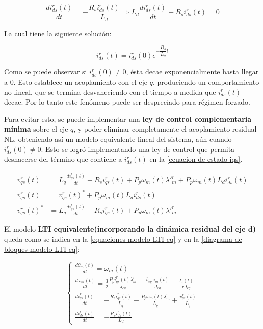 \documentclass[a4paper, 10pt, onecolumn,journal]{ieeeconf}
\begin{document}
\begin{equation}
	\frac{d i^r_{ds}(t)}{dt} = -\frac{R_s i^r_{ds}(t)}{L_d} \Rightarrow L_d\frac{d i^r_{ds}(t)}{dt} + R_s i^r_{ds}(t) = 0
	\label{ecuacion dinamica residual ids}
\end{equation}

La cual tiene la siguiente solución:

\begin{equation}
	{i}^r_{ds}(t) = {i}^r_{ds}(0) e^{-\dfrac{R_s}{L_d}t} 
\end{equation}

Como se puede observar  si $i^{r}_{ds}(0)\neq0$, ésta decae exponencialmente hasta llegar a 0. Esto establece un acoplamiento con el eje $q$, produciendo un comportamiento no lineal, que se termina desvaneciendo con el tiempo a medida que $i^{r}_{ds}(t)$ decae. Por lo tanto este fenómeno puede ser despreciado para régimen forzado.

Para evitar esto, se puede implementar una \textbf{ley de control complementaria mínima} sobre el eje $q$, y poder eliminar completamente el acoplamiento residual NL, obteniendo así un modelo equivalente lineal del sistema, aún cuando $i^{r}_{ds}(0)\neq0$. Esto se logró implementando una ley de control que permita deshacerse del término que contiene a $i^{r}_{ds}(t)$ en la \cref{ecuacion de estado iqs}.

\begin{align}
	v^r_{qs}(t) &= L_q\frac{d i^r_{qs}(t)}{dt} + R_s i^r_{qs}(t) +P_p \omega_m(t) \lambda'^r_m +\underline{P_p \omega_m(t) L_d i^r_{ds}(t)} \label{ley de control complementaria 1 }\\
	v^r_{qs}(t) &= v^r_{qs}(t)^{*} + P_p \omega_m(t) L_d i^r_{ds}(t)  \label{ley de control complementaria 2}\\
 	v^r_{qs}(t)^{*} &= L_q\frac{d i^r_{qs}(t)}{dt} + R_s i^r_{qs}(t) +P_p \omega_m(t) \lambda'^r_m  \label{ley de control complementaria 3}
\end{align}

El modelo \textbf{LTI equivalente(incorporando la dinámica residual del eje $\mathbf{d}$)} queda como se indica en la \cref{equaciones modelo LTI eq} y en la \cref{diagrama de bloques modelo LTI eq}:

\begin{equation}
	\begin{cases}
		\frac{d \theta_m(t)}{dt} = {\omega}_m(t)\\
		\frac{d \omega_m(t)}{dt} = \frac{3}{2} \frac{P_p i^r_{qs}(t)\lambda^r_m}{J_{eq}} - \frac{b_{eq}\omega_m(t)}{J_{eq}} - \frac{T_l(t)}{r J_{eq}}\\
		\frac{d i^r_{qs}(t)}{dt} = -\frac{R_s i^r_{qs}(t)}{L_q} - \frac{P_p \omega_m(t) \lambda^r_m}{L_q}+ \frac{v^r_{qs}(t)}{L_q}\\
		\frac{d i^r_{ds}(t)}{dt} = -\frac{R_s i^r_{ds}(t)}{L_d}	
	\end{cases}
	\label{equaciones modelo LTI eq}
\end{equation}
\end{document}
